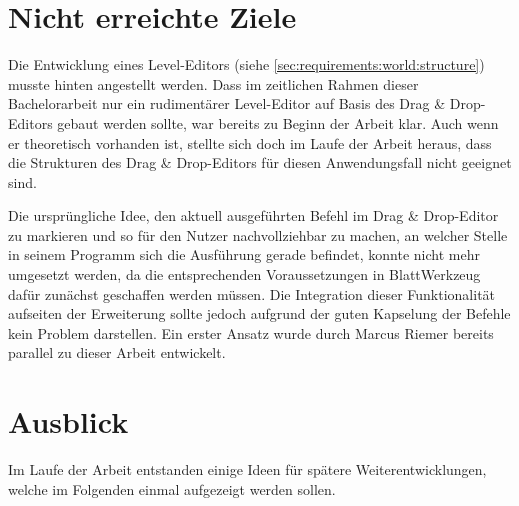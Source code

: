 \section{Nicht erreichte Ziele}
\label{sec:conclusion:open}

Die Entwicklung eines Level-Editors (siehe \ref{sec:requirements:world:structure}) musste hinten angestellt werden. Dass im zeitlichen Rahmen dieser Bachelorarbeit nur ein rudimentärer Level-Editor auf Basis des Drag \& Drop-Editors gebaut werden sollte, war bereits zu Beginn der Arbeit klar. Auch wenn er theoretisch vorhanden ist, stellte sich doch im Laufe der Arbeit heraus, dass die Strukturen des Drag \& Drop-Editors für diesen Anwendungsfall nicht geeignet sind.

Die ursprüngliche Idee, den aktuell ausgeführten Befehl im Drag \& Drop-Editor zu markieren und so für den Nutzer nachvollziehbar zu machen, an welcher Stelle in seinem Programm sich die Ausführung gerade befindet, konnte nicht mehr umgesetzt werden, da die entsprechenden Voraussetzungen in BlattWerkzeug dafür zunächst geschaffen werden müssen. Die Integration dieser Funktionalität aufseiten der Erweiterung sollte jedoch aufgrund der guten Kapselung der Befehle kein Problem darstellen. Ein erster Ansatz wurde durch Marcus Riemer bereits parallel zu dieser Arbeit entwickelt.

\section{Ausblick}
\label{sec:conclusion:future}

Im Laufe der Arbeit entstanden einige Ideen für spätere Weiterentwicklungen, welche im Folgenden einmal aufgezeigt werden sollen.

